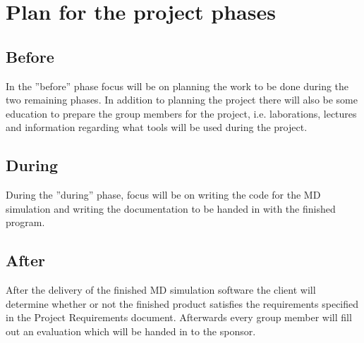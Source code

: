 \section{Plan for the project phases}

\subsection{Before}
In the ''before'' phase focus will be on planning the work to be done during
the two remaining phases. In addition to planning the project there will also
be some education to prepare the group members for the project, i.e.
laborations, lectures and information regarding what tools will be used during
the project.

\subsection{During}
During the ''during'' phase, focus will be on writing the code for the
MD simulation and writing the documentation to be handed in with the finished
program.

\subsection{After}                     
After the delivery of the finished MD simulation software the
client will determine whether or not the finished product satisfies the
requirements specified in the Project Requirements document. Afterwards
every group member will fill out an evaluation which will be handed in to the sponsor.
